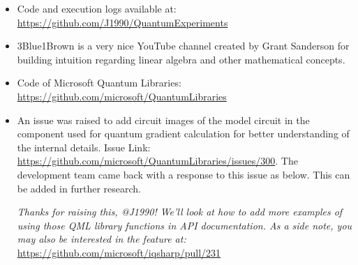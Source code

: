 \documentclass[english,a4paper,11pt,oneside,onecolumn]{book}
\begin{document}
\begin{itemize}
    \item Code and execution logs available at: \url{https://github.com/J1990/QuantumExperiments}
    
    \item 3Blue1Brown \cite{a3blue1brown_2016_vectors} is a very nice YouTube channel created by Grant Sanderson for building intuition regarding linear algebra and other mathematical concepts.
    
    \item Code of Microsoft Quantum Libraries: \url{https://github.com/microsoft/QuantumLibraries}
    
    \item An issue was raised to add circuit images of the model circuit in the component used for quantum gradient calculation for better understanding of the internal details. Issue Link: \url{https://github.com/microsoft/QuantumLibraries/issues/300}.
    The development team came back with a response to this issue as below. This can be added in further research.
    
    \begin{displayquote}
    \emph{Thanks for raising this, @J1990! We'll look at how to add more examples of using those QML library functions in API documentation. As a side note, you may also be interested in the feature at:} \url{https://github.com/microsoft/iqsharp/pull/231}
    \end{displayquote}
\end{itemize}

\pagebreak
\let\clearpage\relax
\end{document}
